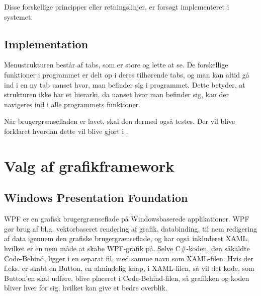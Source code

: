 Disse forskellige principper eller retningslinjer, er forsøgt implementeret i systemet.


\subsection{Implementation}\label{sec:Implementation}

Menustrukturen består af tabs, som er store og lette at se.
De forskellige funktioner i programmet er delt op i deres tilhørende tabs, og man kan altid gå ind i en ny tab uanset hvor, man befinder sig i programmet. 
Dette betyder, at strukturen ikke har et hierarki, da uanset hvor man befinder sig, kan der navigeres ind i alle programmets funktioner.

Når brugergrænsefladen er lavet, skal den dermed også testes. 
Der vil blive forklaret hvordan dette vil blive gjort i .

\section{Valg af grafikframework} 

\subsection{Windows Presentation Foundation}
\ac{WPF} er en grafisk brugergrænseflade på Windowsbaserede applikationer.  
WPF gør brug af  bl.a. vektorbaseret rendering af grafik, databinding, til nem redigering af data igennem den grafiske brugergrænseflade, og har også inkluderet \ac{XAML}, hvilket er en nem måde at skabe WPF-grafik på. 
Selve C\#-koden, den såkaldte Code-Behind, ligger i en separat fil, med samme navn som XAML-filen. 
Hvis der f.eks. er skabt en Button, en almindelig knap, i XAML-filen, så vil det kode, som Button'en skal udføre, blive placeret i Code-Behind-filen, så grafikken og koden bliver hver for sig, hvilket kan give et bedre overblik. \citep{wpf} 

